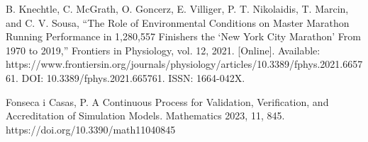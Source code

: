\documentclass[conference]{IEEEtran}
\begin{document}
\begin{thebibliography}{00}
 B. Knechtle, C. McGrath, O. Goncerz, E. Villiger, P. T. Nikolaidis, T. Marcin, and C. V. Sousa, ``The Role of Environmental Conditions on Master Marathon Running Performance in 1,280,557 Finishers the ‘New York City Marathon’ From 1970 to 2019,'' Frontiers in Physiology, vol. 12, 2021. [Online]. Available: https://www.frontiersin.org/journals/physiology/articles/10.3389/fphys.2021.665761. DOI: 10.3389/fphys.2021.665761. ISSN: 1664-042X.

 Fonseca i Casas, P. A Continuous Process for Validation, Verification, and Accreditation of Simulation Models. Mathematics 2023, 11, 845. https://doi.org/10.3390/math11040845

\end{thebibliography}
\vspace{12pt}
\end{document}
